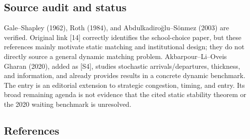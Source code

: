 \documentclass[11pt,a4paper]{article}
\begin{document}
\subsection*{Source audit and status}

Gale--Shapley (1962), Roth (1984), and Abdulkadiroğlu--Sönmez (2003) are verified. Original link [14] correctly identifies the school-choice paper, but these references mainly motivate static matching and institutional design; they do not directly source a general dynamic matching problem. Akbarpour--Li--Oveis Gharan (2020), added as [S4], studies stochastic arrivals/departures, thickness, and information, and already provides results in a concrete dynamic benchmark. The entry is an editorial extension to strategic congestion, timing, and entry. Its broad remaining agenda is not evidence that the cited static stability theorem or the 2020 waiting benchmark is unresolved.

\subsection*{References}
\end{document}
